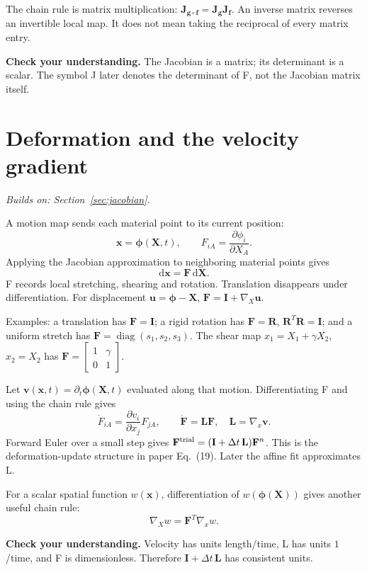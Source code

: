 \documentclass[11pt,a4paper]{article}
\newcommand{\mat}[1]{\mathbf{#1}}
\newcommand{\prereq}[1]{\textit{Builds on: #1}\par}
\newcommand{\checkpoint}[1]{\par\textbf{Check your understanding.} #1\par}
\DeclareMathOperator{\diag}{diag}
\numberwithin{equation}{section}
\begin{document}
The chain rule is matrix multiplication:
$\mat J_{\mat g\circ\mat f}=\mat J_{\mat g}\mat J_{\mat f}$.
An inverse matrix reverses an invertible local map. It does not mean taking
the reciprocal of every matrix entry.
\checkpoint{The Jacobian is a matrix; its determinant is a scalar. The symbol J
later denotes the determinant of F, not the Jacobian matrix itself.}

\section{Deformation and the velocity gradient}\label{sec:deformation}
\prereq{Section~\ref{sec:jacobian}.}
A motion map sends each material point to its current position:
\[
\mat x=\boldsymbol\phi(\mat X,t),\qquad
F_{iA}=\frac{\partial\phi_i}{\partial X_A}.
\]
Applying the Jacobian approximation to neighboring material points gives
\begin{equation}\label{eq:line-map}
\mathrm d\mat x=\mat F\,\mathrm d\mat X.
\end{equation}
F records local stretching, shearing and rotation. Translation disappears
under differentiation. For displacement $\mat u=\boldsymbol\phi-\mat X$,
$\mat F=\mat I+\nabla_X\mat u$.

Examples: a translation has $\mat F=\mat I$; a rigid rotation has
$\mat F=\mat R$, $\mat R^T\mat R=\mat I$; and a uniform stretch has
$\mat F=\diag(s_1,s_2,s_3)$. The shear map $x_1=X_1+\gamma X_2$, $x_2=X_2$
has $\mat F=\left[\begin{smallmatrix}1&\gamma\\0&1\end{smallmatrix}\right]$.

Let $\mat v(\mat x,t)=\partial_t\boldsymbol\phi(\mat X,t)$ evaluated along
that motion. Differentiating F and using the chain rule gives
\begin{equation}\label{eq:Fdot}
\dot F_{iA}=\frac{\partial v_i}{\partial x_j}F_{jA},
\qquad \dot{\mat F}=\mat L\mat F,\quad\mat L=\nabla_x\mat v.
\end{equation}
Forward Euler over a small step gives
$\mat F^{\rm trial}=(\mat I+\Delta t\,\mat L)\mat F^n$.
This is the deformation-update structure in paper Eq.~(19). Later the affine
fit approximates L.

For a scalar spatial function $w(\mat x)$, differentiation of
$w(\boldsymbol\phi(\mat X))$ gives another useful chain rule:
\begin{equation}\label{eq:gradient-transform}
\nabla_X w=\mat F^T\nabla_x w.
\end{equation}
\checkpoint{Velocity has units length/time, L has units $1$/time, and F is
dimensionless. Therefore $\mat I+\Delta t\,\mat L$ has consistent units.}
\end{document}
